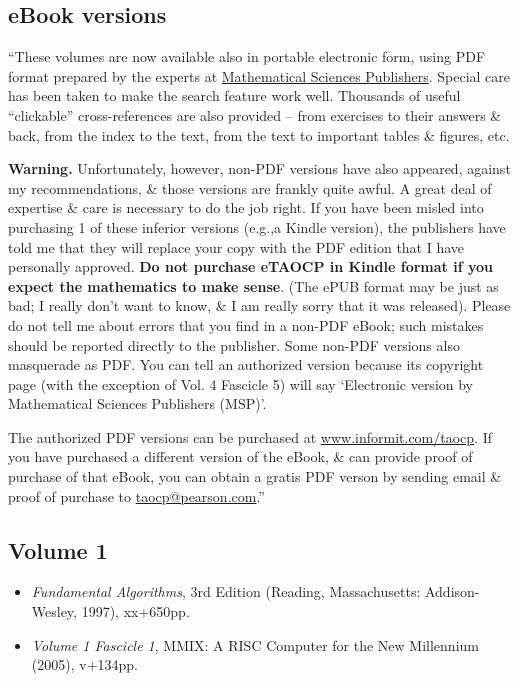 \documentclass[oneside]{book}
\numberwithin{equation}{section}
\begin{document}
\subsection*{eBook versions}
``These volumes are now available also in portable electronic form, using PDF format prepared by the experts at \href{https://msp.org/}{Mathematical Sciences Publishers}. Special care has been taken to make the search feature work well. Thousands of useful ``clickable'' cross-references are also provided -- from exercises to their answers \& back, from the index to the text, from the text to important tables \& figures, etc.

\textbf{Warning.} Unfortunately, however, non-PDF versions have also appeared, against my recommendations, \& those versions are frankly quite awful. A great deal of expertise \& care is necessary to do the job right. If you have been misled into purchasing 1 of these inferior versions (e.g.,a Kindle version), the publishers have told me that they will replace your copy with the PDF edition that I have personally approved. \textbf{Do not purchase eTAOCP in Kindle format if you expect the mathematics to make sense}. (The ePUB format may be just as bad; I really don't want to know, \& I am really sorry that it was released). Please do not tell me about errors that you find in a non-PDF eBook; such mistakes should be reported directly to the publisher. Some non-PDF versions also masquerade as PDF. You can tell an authorized version because its copyright page (with the exception of Vol. 4 Fascicle 5) will say `Electronic version by Mathematical Sciences Publishers (MSP)'.

The authorized PDF versions can be purchased at \url{www.informit.com/taocp}. If you have purchased a different version of the eBook, \& can provide proof of purchase of that eBook, you can obtain a gratis PDF verson by sending email \& proof of purchase to \url{taocp@pearson.com}.''

\subsection*{Volume 1}
\begin{itemize}
	\item \textit{Fundamental Algorithms}, 3rd Edition (Reading, Massachusetts: Addison-Wesley, 1997), xx+650pp.
	\item \textit{Volume 1 Fascicle 1}, MMIX: A RISC Computer for the New Millennium (2005), v+134pp.
\end{itemize}
\end{document}
